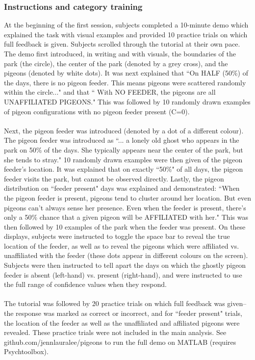 \documentclass{article}
\begin{document}
\subsubsection*{Instructions and category training}
At the beginning of the first session, subjects completed a 10-minute demo which explained the task with visual examples and provided 10 practice trials on which full feedback is given. Subjects scrolled through the tutorial at their own pace. The demo first introduced, in writing and with visuals, the boundaries of the park (the circle), the center of the park (denoted by a grey cross), and the pigeons (denoted by white dots). It was next explained that ``On HALF (50\%) of the days, there is no pigeon feeder. This means pigeons were scattered randomly within the circle..." and that `` With NO FEEDER, the pigeons are all UNAFFILIATED PIGEONS." This was followed by 10 randomly drawn examples of pigeon configurations with no pigeon feeder present (C=0). \\\\
Next, the pigeon feeder was introduced (denoted by a dot of a different colour). The pigeon feeder was introduced as ``... a lonely old ghost who appears in the park on 50\% of the days. She typically appears near the center of the park, but she tends to stray." 10 randomly drawn examples were then given of the pigeon feeder's location. It was explained that on exactly ``50\%" of all days, the pigeon feeder visits the park, but cannot be observed directly. Lastly, the pigeon distribution on ``feeder present" days was explained and demonstrated: ``When the pigeon feeder is present, pigeons tend to cluster around her location. But even pigeons can't always sense her presence. Even when the feeder is present, there's only a 50\% chance that a given pigeon will be AFFILIATED with her." This was then followed by 10 examples of the park when the feeder was present. On these displays, subjects were instructed to toggle the space bar to reveal the true location of the feeder, as well as to reveal the pigeons which were affiliated vs. unaffiliated with the feeder (these dots appear in different colours on the screen). Subjects were then instructed to tell apart the days on which the ghostly pigeon feeder is absent (left-hand) vs. present (right-hand), and were instructed to use the full range of confidence values when they respond. \\\\ The tutorial was followed by 20 practice trials on which full feedback was given-- the response was marked as correct or incorrect, and for ``feeder present" trials, the location of the feeder as well as the unaffiliated and affiliated pigeons were revealed. These practice trials were not included in the main analysis. See github.com/jennlauralee/pigeons to run the full demo on MATLAB (requires Psychtoolbox).
\end{document}
